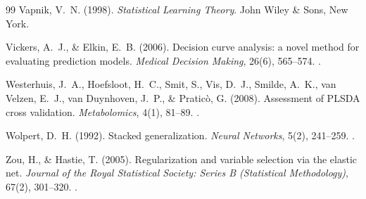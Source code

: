 \documentclass[11pt,oneside]{book}
\begin{document}
\begin{thebibliography}{99}
Vapnik, V.~N. (1998). \textit{Statistical Learning Theory}. John Wiley \& Sons, New York.

Vickers, A.~J., \& Elkin, E.~B. (2006). Decision curve analysis: a novel method for evaluating prediction models. \textit{Medical Decision Making}, 26(6), 565--574. .

Westerhuis, J.~A., Hoefsloot, H.~C., Smit, S., Vis, D.~J., Smilde, A.~K., van Velzen, E.~J., van Duynhoven, J.~P., \& Pratic\`o, G. (2008). Assessment of PLSDA cross validation. \textit{Metabolomics}, 4(1), 81--89. .

Wolpert, D.~H. (1992). Stacked generalization. \textit{Neural Networks}, 5(2), 241--259. .

Zou, H., \& Hastie, T. (2005). Regularization and variable selection via the elastic net. \textit{Journal of the Royal Statistical Society: Series B (Statistical Methodology)}, 67(2), 301--320. .

\end{thebibliography}
\end{document}
